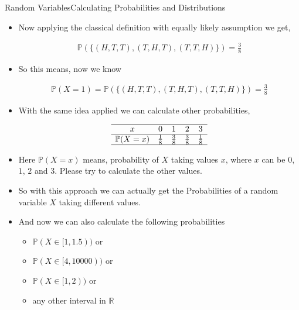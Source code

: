 \documentclass[8pt, usepdftitle=false]{beamer}
\begin{document}
\begin{frame}[allowframebreaks]{Random Variables}{Calculating Probabilities and Distributions}
\begin{itemize}
 


\item Now applying the classical definition with equally likely assumption we get,



\begin{align*}
	\mathbb{P}\left(\{ (H,T,T), (T,H,T), (T,T,H)\}\right)=\frac{3}{8}
\end{align*} 



\item So this means, now we know 

\begin{align*}
	\mathbb{P}(X =1)=\mathbb{P}\left(\{ (H,T,T), (T,H,T), (T,T,H)\}\right)=\frac{3}{8}
\end{align*}



\item With the same idea applied we can calculate other probabilities, 

\begin{align*}
\begin{array}{ccccc}
\hline x & 0 & 1 & 2 & 3 \\
\hline \mathbb{P}(X=x) & \frac{1}{8} & \frac{3}{8} & \frac{3}{8} & \frac{1}{8} \\
\hline
\end{array}
\end{align*}

\item Here $ \mathbb{P}(X=x)$ means, probability of $X$ taking values $x$, where $x$ can be $0$, $1$, $2$ and $3$. Please try to calculate the other values.



\item So with this approach we can actually get the Probabilities of a random variable $X$ taking different values.

\item And now we can also calculate the following probabilities 

\medskip
\begin{itemize}
	\item  $\mathbb{P}( X \in [1, 1.5)) $  or 
	\item $\mathbb{P}( X \in [4, 10000)) $ or 
	\item $\mathbb{P}( X \in [1, 2)) $ or 
	\item any other interval in $\mathbb{R}$
\end{itemize}
\medskip




\end{itemize}
\end{frame}
\end{document}
